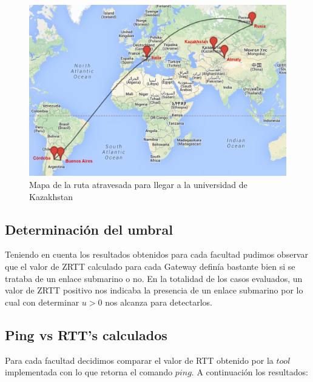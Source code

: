 \begin{figure}[H]
	\begin{center}
		  \includegraphics[scale=0.4]{../mapas/mapa_aipet.png}
		  \caption{Mapa de la ruta atravesada para llegar a la universidad de Kazakhstan}
		  \label{fig:contra1}
	\end{center}
\end{figure}

\subsection{Determinación del umbral}

Teniendo en cuenta los resultados obtenidos para cada facultad pudimos observar que el valor de ZRTT calculado para cada Gateway definía bastante bien si se trataba de un enlace submarino o no. En la totalidad de los casos evaluados, un valor de ZRTT positivo nos indicaba la presencia de un enlace submarino por lo cual con determinar $u>0$ nos alcanza para detectarlos.


\subsection{Ping vs RTT's calculados}

Para cada facultad decidimos comparar el valor de RTT obtenido por la $tool$ implementada con lo que retorna el comando $ping$. A continuación los resultados:

